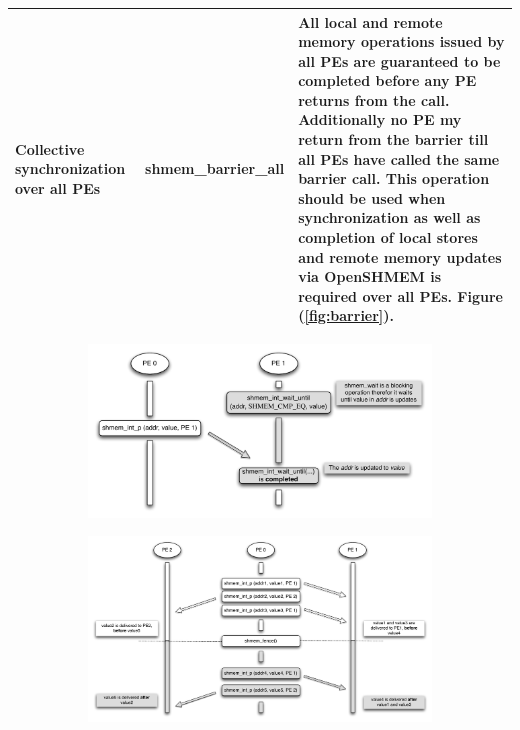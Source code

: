 \begin{tabular}{|p{}|p{}|p{}|}
\hline 
Collective synchronization over all \ac{PE}s & shmem\_barrier\_all & {All local and remote memory operations issued by all \ac{PE}s are guaranteed to be completed before any \ac{PE} returns from the call. Additionally no \ac{PE} my return from the barrier till all \ac{PE}s have called the same barrier call. This operation should be used when synchronization as well as completion of local stores and remote memory updates via OpenSHMEM is required over all \ac{PE}s. Figure (\ref{fig:barrier}).} \tabularnewline
\hline 
\end{tabular}

\begin{figure}
        \centering
        \begin{subfigure}{0.48\textwidth}
                \includegraphics[width=\textwidth]{diagrams/updated/wait}
                \caption{}
                \label{fig:wait}
        \end{subfigure}
        \begin{subfigure}{0.48\textwidth}
                \includegraphics[width=\textwidth]{diagrams/updated/fence}
                \caption{}
                \label{fig:fence}
        \end{subfigure}

\end{figure}
